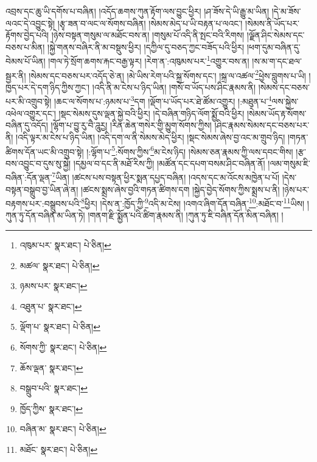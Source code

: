 འབྲས་དང་ཆུ་ཡི་དགོས་པ་བཞིན། །འདོད་ཆགས་ཀུན་རྟོག་ལས་བྱུང་ཕྱིར། །ཤ་ཟོས་དེ་ཡི་རྒྱུ་མ་ཡིན། །དེ་མ་ཟོས་ལའང་དེ་འབྱུང་སྟེ། །རྩྭ་ཟན་བ་ལང་ལ་སོགས་བཞིན། །སེམས་མེད་པ་ཡི་བརྟན་པ་ལའང་། །སེམས་ནི་ཡོད་པར་རྟོགས་བྱེད་པའི། །ཉེས་བསྟན་གསུམ་ལ་མཐོང་བས་ན། །གསུམ་པོ་འདི་ནི་སྤང་བའི་རིགས། །ལྗོན་ཤིང་སེམས་དང་བཅས་པ་མིན། །སྐྱེ་གནས་བཞིར་ནི་མ་བསྡུས་ཕྱིར། །དཀྱིལ་དུ་བཅད་ཀྱང་བཟོད་པའི་ཕྱིར། །ཕག་དུམ་བཞིན་དུ་བེམས་པོ་ཡིན། །གལ་ཏེ་སྲོག་ཆགས་རྐང་བརྒྱ་ལྟར། །རེག་ན་:འཁུམས་པར་\footnote{འཁུམ་པར་  སྣར་ཐང་།  པེ་ཅིན། }འགྱུར་བས་ན། །ས་མ་ག་དང་ཐལ་སྦྱར་ནི། །སེམས་དང་བཅས་པར་འདོད་ཅེ་ན། །མེ་ཡིས་རེག་པའི་སྐྲ་སོགས་དང་། །སྐྲ་ལ་འཚལ་\footnote{མཚལ་  སྣར་ཐང་།  པེ་ཅིན། }ཕྱེས་བླུགས་པ་ཡི། །ཁྱད་པར་དེ་དག་ཉིད་ཀྱིས་ཀྱང་། །འདི་ནི་མ་ངེས་པ་ཉིད་ཡིན། །གསོ་བ་ཡོད་པས་ཤིང་རྣམས་ནི། །སེམས་དང་བཅས་པར་མི་འགྲུབ་སྟེ། །ཆང་ལ་སོགས་པ་:ཉམས་པ་\footnote{ཉམས་པར་  སྣར་ཐང་། }དག །ལྡོག་པ་ཡོད་པར་ཐེ་ཚོམ་འགྱུར། །:མཐུན་པ་\footnote{འཐུན་པ་  སྣར་ཐང་། }ལས་སྐྱེས་འཕེལ་འགྱུར་དང་། །སྡང་སེམས་དུས་ལྡན་སྐྱེ་བའི་ཕྱིར། །དེ་བཞིན་གཉིད་ལོག་སྨྱོ་བའི་ཕྱིར། །སེམས་ཡོད་རྟ་སོགས་བཞིན་དུ་འདོད། །ལྷོག་པ་བྱུ་རུ་བཻ་ཌཱུརྱ། །རིན་ཆེན་གསེར་གྱི་མྱུག་སོགས་ཀྱིས། །ཤིང་རྣམས་སེམས་དང་བཅས་པར་ནི། །འདི་ལྟར་མ་ངེས་པ་ཉིད་ཡིན། །འདི་དག་ལ་ནི་སེམས་མེད་ཕྱིར། །སྡང་སེམས་ཞེས་བྱ་འང་མ་གྲུབ་ཉིད། །གཏན་ཚིགས་དོན་ཡང་མི་འགྲུབ་སྟེ། །:ལྷོག་པ་\footnote{ལྡོག་པ་  སྣར་ཐང་།  པེ་ཅིན། }:སོགས་ཀྱིས་\footnote{སོགས་ཀྱི་  སྣར་ཐང་།  པེ་ཅིན། }མ་ངེས་ཉིད། །སེམས་ཅན་རྣམས་ཀྱི་ལས་དབང་གིས། །རྩ་བས་འབྱུང་བ་དུས་སུ་སྐྱེ། །དམྱལ་བ་དང་ནི་མཐོ་རིས་ཀྱི། །མཚོན་དང་དཔག་བསམ་ཤིང་བཞིན་ནོ། །ལམ་གསུམ་ཇི་བཞིན་:དོན་ལྡན་\footnote{ཆོས་ལྡན་  སྣར་ཐང་། }ཡིན། །ཚངས་པས་བསྟན་ཕྱིར་སྨན་དཔྱད་བཞིན། །འདས་དང་མ་འོངས་མཁྱེན་པ་པོ། །དེས་བསྟན་བསྒྲུབ་བྱ་ཡིན་ཞེ་ན། །ཚངས་སྨྲས་ཞེས་བྱའི་གཏན་ཚིགས་དག །སྐྱེད་བྱེད་སོགས་ཀྱིས་སྨྲས་པ་ནི། །ཉེས་པར་བརྟགས་པར་:བསྒྲུབས་པའི་\footnote{བསྒྲུབ་པའི་  སྣར་ཐང་། }ཕྱིར། །དེས་ན་:ཁྱོད་ཀྱི་\footnote{ཁྱོད་ཀྱིས་  སྣར་ཐང་། }འདི་མ་ངེས། །འགའ་ཞིག་དོན་བཞིན་\footnote{བཞིན་མ་  སྣར་ཐང་།  པེ་ཅིན། }:མཐོང་བ་\footnote{མཐོང་  སྣར་ཐང་།  པེ་ཅིན། }ཡིས། །ཀུན་ཏུ་དོན་བཞིན་མ་ཡིན་ཏེ། །གནག་རྫི་སྨྱོན་པའི་ཚིག་རྣམས་ནི། །ཀུན་ཏུ་ཇི་བཞིན་དོན་མིན་བཞིན། །
